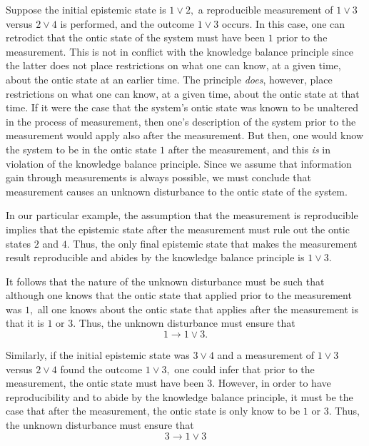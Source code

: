 \documentclass[pra,nofootinbib,showpacs,12pt]{revtex4}
\begin{document}
Suppose the initial epistemic state is $1\vee 2,$ a reproducible measurement
of $1\vee 3$ versus $2\vee 4$ is performed, and the outcome $1\vee 3$
occurs. In this case, one can retrodict that the ontic state of the system
must have been $1$ prior to the measurement. This is not in conflict with
the knowledge balance principle since the latter does not place restrictions
on what one can know, at a given time, about the ontic state at an earlier
time. The principle \emph{does}, however, place restrictions on what one can
know, at a given time, about the ontic state at that time. If it were the
case that the system's ontic state was known to be unaltered in the process
of measurement, then one's description of the system prior to the
measurement would apply also after the measurement. But then, one would know
the system to be in the ontic state $1$ after the measurement, and this
\emph{is} in violation of the knowledge balance principle. Since we assume
that information gain through measurements is always possible, we must
conclude that measurement causes an unknown disturbance to the ontic state
of the system.

In our particular example, the assumption that the measurement is
reproducible implies that the epistemic state after the measurement must
rule out the ontic states $2$ and $4$. Thus, the only final epistemic state
that makes the measurement result reproducible and abides by the knowledge
balance principle is $1\vee 3.$

It follows that the nature of the unknown disturbance must be such that
although one knows that the ontic state that applied prior to the
measurement was $1,$ all one knows about the ontic state that applies after
the measurement is that it is $1$ or $3.$ Thus, the unknown disturbance must
ensure that
\begin{equation}
1\rightarrow 1\vee 3.
\end{equation}

Similarly, if the initial epistemic state was $3\vee 4$ and a measurement of
$1\vee 3$ versus $2\vee 4$ found the outcome $1\vee 3,$ one could infer that
prior to the measurement, the ontic state must have been $3.$ However, in
order to have reproducibility and to abide by the knowledge balance
principle, it must be the case that after the measurement, the ontic state
is only know to be $1$ or $3.$ Thus, the unknown disturbance must ensure
that
\begin{equation}
3\rightarrow 1\vee 3
\end{equation}
\end{document}
